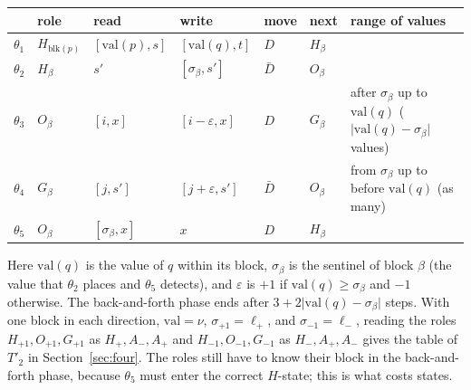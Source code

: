\documentclass{article}
\theoremstyle{definition}
\theoremstyle{remark}
\begin{document}
\begin{center}
\small
\begin{tabular}{lllllll}
\toprule
& role & read & write & move & next & range of values \\
\midrule
$\theta_1$ & $H_{\mathrm{blk}(p)}$ & $[\mathrm{val}(p),s]$ & $[\mathrm{val}(q),t]$ & $D$ & $H_\beta$ & \\
$\theta_2$ & $H_\beta$ & $s'$ & $[\sigma_\beta,s']$ & $\bar D$ & $O_\beta$ & \\
$\theta_3$ & $O_\beta$ & $[i,x]$ & $[i-\varepsilon,x]$ & $D$ & $G_\beta$ & after $\sigma_\beta$ up to $\mathrm{val}(q)$ ($\lvert\mathrm{val}(q)-\sigma_\beta\rvert$ values) \\
$\theta_4$ & $G_\beta$ & $[j,s']$ & $[j+\varepsilon,s']$ & $\bar D$ & $O_\beta$ & from $\sigma_\beta$ up to before $\mathrm{val}(q)$ (as many) \\
$\theta_5$ & $O_\beta$ & $[\sigma_\beta,x]$ & $x$ & $D$ & $H_\beta$ & \\
\bottomrule
\end{tabular}
\end{center}
Here $\mathrm{val}(q)$ is the value of $q$ within its block, $\sigma_\beta$ is the sentinel of block $\beta$ (the value that $\theta_2$ places and $\theta_5$ detects), and $\varepsilon$ is $+1$ if $\mathrm{val}(q)\ge\sigma_\beta$ and $-1$ otherwise. The back-and-forth phase ends after $3+2\lvert\mathrm{val}(q)-\sigma_\beta\rvert$ steps.
With one block in each direction, $\mathrm{val}=\nu$, $\sigma_{+1}=\ell_+$, and $\sigma_{-1}=\ell_-$, reading the roles $H_{+1},O_{+1},G_{+1}$ as $H_+,A_-,A_+$ and $H_{-1},O_{-1},G_{-1}$ as $H_-,A_+,A_-$ gives the table of $T'_2$ in Section~\ref{sec:four}.
The roles still have to know their block in the back-and-forth phase, because $\theta_5$ must enter the correct $H$-state; this is what costs states.
\end{document}
